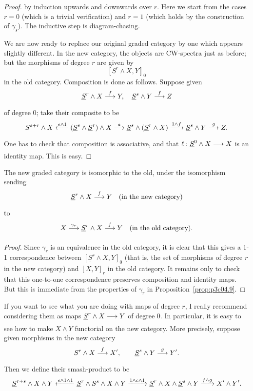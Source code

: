 \documentclass[../main]{subfiles}
\begin{document}
\begin{proof}
by induction upwards and downwards over $r$. Here we start from the cases $r = 0$ (which is a trivial verification) and $r = 1$ (which holds by the construction of $\gamma_s$). The inductive step is diagram-chasing.

We are now ready to replace our original graded category by one which appears slightly different. In the new category, the objects are CW-spectra just as before; but the morphisms of degree $r$ are given by \[[\underline S^r \wedge X, Y]_0\] in the old category. Composition is done as follows. Suppose given \[\underline S^r \wedge X \lar{f} Y, \quad \underline S^s \wedge Y \lar{f} Z\] of degree 0; take their composite to be \[S^{s + r} \wedge X \xleftarrow{e \wedge 1} (\underline S^s \wedge \underline S^r) \wedge X \lar{a} \underline S^s \wedge (\underline S^r \wedge X) \vra{1 \wedge f} \underline S^s \wedge Y \lar{g} Z.\] One has to check that composition is associative, and that $\ell : \underline S^0 \wedge X \lar{} X$ is an identity map. This is easy.
\end{proof}

\begin{proposition}\label{prop:p3ch04.10}
The new graded category is isomorphic to the old, under the isomorphism sending \[\underline S^r \wedge X \lar{f} Y \quad \text {(in the new category)}\] to \[X \lar{\gamma_r} \underline S^r \wedge X \lar{f} Y \quad \text{(in the old category).}\]
\end{proposition}

\begin{proof}
Since $\gamma_r$ is an equivalence in the old category, it is clear that this gives a 1-1 correspondence between $[\underline S^r \wedge X, Y]_0$ (that is, the set of morphisms of degree $r$ in the new category) and $[X,Y]_r$ in the old category. It remains only to check that this one-to-one correspondence preserves composition and identity maps. But this is immediate from the properties of $\gamma_r$ in Proposition~\ref{prop:p3c04.9}.
\end{proof}

If you want to see what you are doing with maps of degree $r$, I really recommend considering them as maps $\underline S^r \wedge X \lar{} Y$ of degree $0$. In particular, it is easy to see how to make $X \wedge Y$ functorial on the new category. More precisely, suppose given morphisms in the new category \[S^r \wedge X \lar{f} X', \qquad \underline S^s \wedge Y \lar{g} Y'.\] Then we define their smash-product to be \[\underline S^{r + s} \wedge X \wedge Y \xleftarrow{e \wedge 1 \wedge 1} \underline S^r \wedge S^s \wedge X \wedge Y \lar{1 \wedge c \wedge 1} \underline S^r \wedge X \wedge \underline S^s \wedge Y \lar{f \wedge g} X' \wedge Y'.\]
\end{document}
